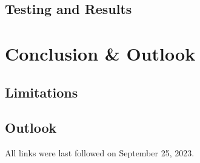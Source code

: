 \documentclass[
  a4paper,  %
  twoside,  %
  bibliography=totoc,
  headsepline,
  cleardoublepage=empty,
  parskip=half,
  draft=false
]{scrbook}
\begin{document}
\section{Testing and Results}


\chapter{Conclusion \& Outlook}

\section{Limitations}

\section{Outlook}


\printbibliography

All links were last followed on September 25, 2023.

\appendix



\pagestyle{empty}
\renewcommand*{\chapterpagestyle}{empty}
\Versicherung
\end{document}
